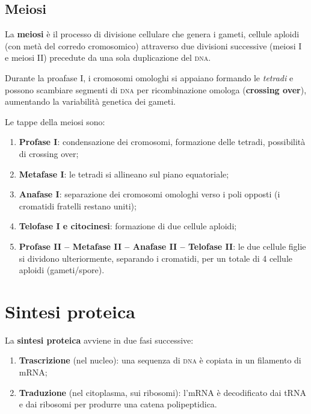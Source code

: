 \documentclass[11pt,a4paper,openright,twoside]{book}
\theoremstyle{definition}
\theoremstyle{plain}
\theoremstyle{remark}
\newcommand{\dna}{\textsc{dna}}
\begin{document}
\subsection{Meiosi}

La \textbf{meiosi} è il processo di divisione cellulare che genera i gameti, cellule aploidi (con metà del corredo cromosomico) attraverso due divisioni successive (meiosi I e meiosi II) precedute da una sola duplicazione del \dna.

\begin{tcolorbox}[defbox, title={Crossing over}]
  Durante la proafase I, i cromosomi omologhi si appaiano formando le \textit{tetradi} e possono scambiare segmenti di \dna{} per ricombinazione omologa (\textbf{crossing over}), aumentando la variabilità genetica dei gameti.
\end{tcolorbox}

Le tappe della meiosi sono:
\begin{enumerate}
  \item \textbf{Profase I}: condensazione dei cromosomi, formazione delle tetradi, possibilità di crossing over;
  \item \textbf{Metafase I}: le tetradi si allineano sul piano equatoriale;
  \item \textbf{Anafase I}: separazione dei cromosomi omologhi verso i poli opposti (i cromatidi fratelli restano uniti);
  \item \textbf{Telofase I e citocinesi}: formazione di due cellule aploidi;
  \item \textbf{Profase II -- Metafase II -- Anafase II -- Telofase II}: le due cellule figlie si dividono ulteriormente, separando i cromatidi, per un totale di 4 cellule aploidi (gameti/spore).
\end{enumerate}

\section{Sintesi proteica}

La \textbf{sintesi proteica} avviene in due fasi successive:
\begin{enumerate}
  \item \textbf{Trascrizione} (nel nucleo): una sequenza di \dna{} è copiata in un filamento di mRNA;
  \item \textbf{Traduzione} (nel citoplasma, sui ribosomi): l'mRNA è decodificato dai tRNA e dai ribosomi per produrre una catena polipeptidica.
\end{enumerate}
\end{document}
